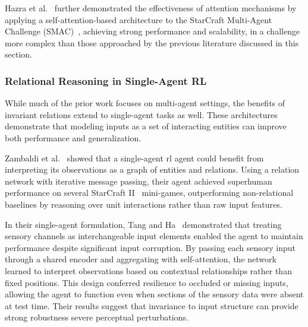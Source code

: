 \documentclass{article}
\begin{document}
Hazra et al.~\cite{hazra2024} further demonstrated the effectiveness 
of attention mechanisms by applying a self-attention-based architecture 
to the StarCraft Multi-Agent Challenge (SMAC)~\cite{samvelyan2019}, 
achieving strong performance and scalability,
in a challenge more complex than those approached by the previous 
literature discussed in this section.

\subsubsection{Relational Reasoning in Single-Agent RL}
While much of the prior work focuses on multi-agent settings, 
the benefits of invariant relations extend to single-agent tasks as well. 
These architectures demonstrate that modeling inputs as a set of 
interacting entities can improve both performance and generalization.

Zambaldi et al.~\cite{zambaldi2018} showed that a single-agent \gls{rl} agent could 
benefit from interpreting its observations as a graph of entities and relations. 
Using a relation network with iterative message passing, their agent achieved 
superhuman performance on several StarCraft II~\cite{vinyals2019} mini-games, 
outperforming non-relational baselines by reasoning over unit interactions 
rather than raw input features.

In their single-agent formulation, Tang and Ha~\cite{tang2021} demonstrated 
that treating sensory channels as interchangeable input elements enabled 
the agent to maintain performance despite significant input corruption. 
By passing each sensory input through a shared encoder and aggregating 
with self-attention, the network learned to interpret observations based 
on contextual relationships rather than fixed positions. 
This design conferred resilience to occluded or missing inputs, 
allowing the agent to function even when sections of the sensory 
data were absent at test time. Their results suggest that invariance 
to input structure can provide strong robustness
severe perceptual perturbations.

\begin{comment}
    They propose a very similar question:
        "Sensory substitution refers to the brain’s ability to use one sensory modality 
        (e.g., touch) to supply environmental information normally gathered by 
        another sense (e.g., vision)."
    - Extremely similar to my interest in sensory degradation.
    - However, in their experiments they instead demonstrate an invariance in a singular
    observational domain. (They take a 2d image, chunk it and shuffle.)
\end{comment}
\end{document}
